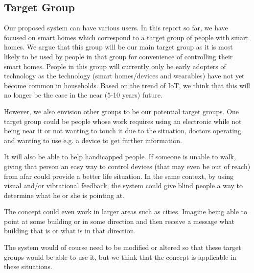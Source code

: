 \subsection{Target Group}
Our proposed system can have various users. 
In this report so far, we have focused on smart homes which correspond to a target group of people with smart homes. 
We argue that this group will be our main target group as it is most likely to be used by people in that group for convenience of controlling their smart homes. 
People in this group will currently only be early adopters of technology as the technology (smart homes/devices and wearables) have not yet become common in households.
Based on the trend of IoT, we think that this will no longer be the case in the near (5-10 years) future. 
 
However, we also envision other groups to be our potential target groups.
One target group could be people whose work requires using an electronic while not being near it or not wanting to touch it due to the situation,
\eg doctors operating and wanting to use e.g. a device to get further information.

It will also be able to help handicapped people. 
If someone is unable to walk, giving that person an easy way to control devices (that may even be out of reach) from afar could provide a better life situation. 
In the same context, by using visual and/or vibrational feedback, 
the system could give blind people a way to determine what he or she is pointing at. 

The concept could even work in larger areas such as cities. 
Imagine being able to point at some building or in some direction and then receive a message what building that is or what is in that direction. 

The system would of course need to be modified or altered so that these target groups would be able to use it, 
but we think that the concept is applicable in these situations. 
 